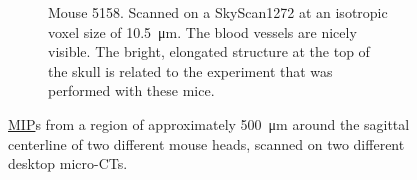 \documentclass[a4paper]{exam}
\newlength\imagewidth%
\newlength\imagescale%
\begin{document}
\begin{questions}
\begin{figure}[h]
\begin{subfigure}{0.495\textwidth}
%
		\caption{Mouse 5158.
		Scanned on a SkyScan1272 at an isotropic voxel size of \SI{10.5}{\micro\meter}.
		The blood vessels are nicely visible.
		The bright, elongated structure at the top of the skull is related to the experiment that was performed with these mice.}
		\label{fig:5158}
	\end{subfigure}	
	\caption{\href{https://en.wikipedia.org/wiki/Maximum_intensity_projection}{MIP}s from a region of approximately \SI{500}{\micro\meter} around the sagittal centerline of two different mouse heads, scanned on two different desktop micro-CTs.}
\end{figure}

\end{questions}
\end{document}
